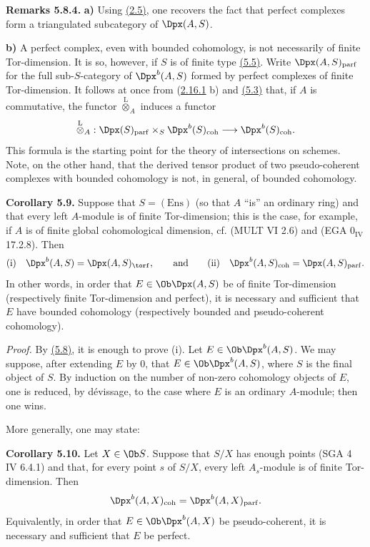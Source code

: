 \textbf{Remarks 5.8.4.} \textbf{a)} Using \hyperlink{sga6.e01.prop.2-5}{(2.5)}, one recovers the fact that perfect complexes form a triangulated subcategory of \(\Dpx(A,S)\).

\textbf{b)} A perfect complex, even with bounded cohomology, is not necessarily of finite Tor-dimension. It is so, however, if \(S\) is of finite type \hyperlink{sga6.e01.para.5-5}{(5.5)}. Write \(\Dpx(A,S)_{\mathrm{parf}}\) for the full sub-\(S\)-category of \(\Dpx^b(A,S)\) formed by perfect complexes of finite Tor-dimension. It follows at once from (\hyperlink{sga6.e01.cor.2-16-1}{2.16.1} b) and \hyperlink{sga6.e01.para.5-3}{(5.3)} that, if \(A\) is commutative, the functor \(\overset{\mathrm L}{\otimes}_A\) induces a functor
\[
  \overset{\mathrm L}{\otimes}_A:
  \Dpx(S)_{\mathrm{parf}}\times_S \Dpx^b(S)_{\mathrm{coh}}
  \longrightarrow \Dpx^b(S)_{\mathrm{coh}}.
\]
This formula is the starting point for the theory of intersections on schemes. Note, on the other hand, that the derived tensor product of two pseudo-coherent complexes with bounded cohomology is not, in general, of bounded cohomology.

\textbf{Corollary 5.9.} Suppose that \(S=(\mathrm{Ens})\) (so that \(A\) ``is'' an ordinary ring) and that every left \(A\)-module is of finite Tor-dimension; this is the case, for example, if \(A\) is of finite global cohomological dimension, cf. (MULT VI 2.6) and (EGA \(0_{\mathrm{IV}}\) 17.2.8). Then
\[
\text{(i)}\quad \Dpx^b(A,S)=\Dpx(A,S)_{\torf},
\qquad
\text{and}
\qquad
\text{(ii)}\quad \Dpx^b(A,S)_{\mathrm{coh}}=\Dpx(A,S)_{\mathrm{parf}}.
\]
In other words, in order that \(E\in\Ob\Dpx(A,S)\) be of finite Tor-dimension (respectively finite Tor-dimension and perfect), it is necessary and sufficient that \(E\) have bounded cohomology (respectively bounded and pseudo-coherent cohomology).

\emph{Proof.} By \hyperlink{sga6.e01.thm.5-8}{(5.8)}, it is enough to prove (i). Let \(E\in\Ob\Dpx^b(A,S)\). We may suppose, after extending \(E\) by \(0\), that \(E\in\Ob\Dpx^b(A,S)\), where \(S\) is the final object of \(S\). By induction on the number of non-zero cohomology objects of \(E\), one is reduced, by dévissage, to the case where \(E\) is an ordinary \(A\)-module; then one wins.

More generally, one may state:

\textbf{Corollary 5.10.} Let \(X\in\Ob S\). Suppose that \(S/X\) has enough points (SGA 4 IV 6.4.1) and that, for every point \(s\) of \(S/X\), every left \(A_s\)-module is of finite Tor-dimension. Then
\[
  \Dpx^b(A,X)_{\mathrm{coh}}=\Dpx^b(A,X)_{\mathrm{parf}}.
\]
Equivalently, in order that \(E\in\Ob\Dpx^b(A,X)\) be pseudo-coherent, it is necessary and sufficient that \(E\) be perfect.

